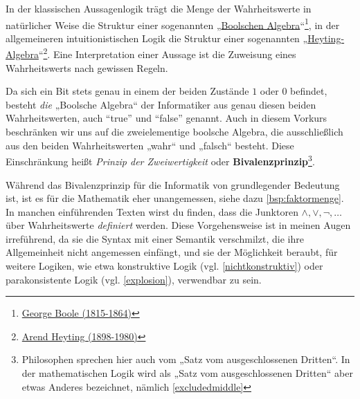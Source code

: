 \begin{vorschau}[Bivalenzprinzip] \label{bivalenz} 
    In der klassischen Aussagenlogik trägt die Menge der Wahrheitswerte in natürlicher Weise die Struktur einer sogenannten „\href{https://en.wikipedia.org/wiki/Boolean_algebra_(structure)}{Boolschen Algebra}“\footnote{\href{https://de.wikipedia.org/wiki/George_Boole}{George Boole (1815-1864)}}, in der allgemeineren intuitionistischen Logik die Struktur einer sogenannten „\href{https://ncatlab.org/nlab/show/Heyting+algebra}{Heyting-Algebra}“\footnote{\href{https://de.wikipedia.org/wiki/Arend_Heyting}{Arend Heyting (1898-1980)}}. Eine Interpretation einer Aussage ist die Zuweisung eines Wahrheitswerts nach gewissen Regeln.
    
    Da sich ein Bit stets genau in einem der beiden Zustände $1$ oder $0$ befindet, besteht \emph{die} „Boolsche Algebra“ der Informatiker aus genau diesen beiden Wahrheitswerten, auch ``true'' und ``false'' genannt. Auch in diesem Vorkurs beschränken wir uns auf die zweielementige boolsche Algebra, die ausschließlich aus den beiden Wahrheitswerten „wahr“ und „falsch“ besteht. Diese Einschränkung heißt \emph{Prinzip der Zweiwertigkeit} oder \textbf{Bivalenzprinzip}\footnote{Philosophen sprechen hier auch vom „Satz vom ausgeschlossenen Dritten“. In der mathematischen Logik wird als „Satz vom ausgeschlossenen Dritten“ aber etwas Anderes bezeichnet, nämlich \cref{excludedmiddle}}.
    
    Während das Bivalenzprinzip für die Informatik von grundlegender Bedeutung ist, ist es für die Mathematik eher unangemessen, siehe dazu \cref{bsp:faktormenge}. In manchen einführenden Texten wirst du finden, dass die Junktoren $\land,\lor,\neg,\dots$ über Wahrheitswerte \emph{definiert} werden. Diese Vorgehensweise ist in meinen Augen irreführend, da sie die Syntax mit einer Semantik verschmilzt, die ihre Allgemeinheit nicht angemessen einfängt, und sie der Möglichkeit beraubt, für weitere Logiken, wie etwa konstruktive Logik (vgl. \cref{nichtkonstruktiv}) oder parakonsistente Logik (vgl. \cref{explosion}), verwendbar zu sein.
\end{vorschau}


\begin{comment}
\begin{bem}[* „Konstante“ Aussagen]
    In der Aussagenlogik kann es bequem sein, Aussagezeichen einzuführen, die für eine Aussage stehen, die stets wahr oder stets falsch sein sollen:
    \begin{itemize}
        \item Mit „$\top$“ (wie englisch ``true'') ist eine Aussage gemeint, die in einem absoluten Sinn immer wahr sein soll.
        \item Mit „$\bot$“ ist eine Aussage gemeint, die in einem absoluten Sinn falsch sein soll, unabhängig davon, wie sie interpretiert wird.
    \end{itemize}
\end{bem}
\end{comment}
 

